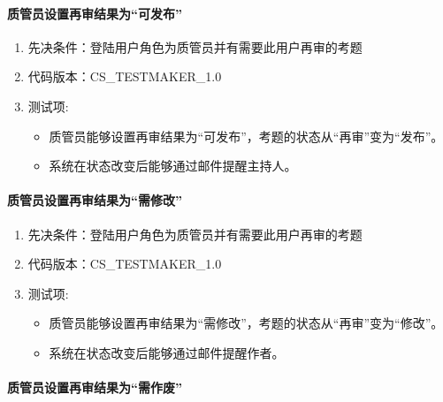 \documentclass[hyperref, a4paper]{ctexart}
\providecommand{\tightlist}{%
  \setlength{\itemsep}{0pt}\setlength{\parskip}{0pt}}
\let\oldparagraph\paragraph
\renewcommand{\paragraph}[1]{\oldparagraph{#1}\mbox{}}
\begin{document}
\hypertarget{ux8d28ux7ba1ux5458ux8bbeux7f6eux518dux5ba1ux7ed3ux679cux4e3aux53efux53d1ux5e03}{%
\paragraph{质管员设置再审结果为``可发布''}\label{ux8d28ux7ba1ux5458ux8bbeux7f6eux518dux5ba1ux7ed3ux679cux4e3aux53efux53d1ux5e03}}

\begin{enumerate}
\def\labelenumi{\arabic{enumi}.}
\tightlist
\item
  先决条件：登陆用户角色为质管员并有需要此用户再审的考题
\item
  代码版本：CS\_TESTMAKER\_1.0
\item
  测试项:

  \begin{itemize}
  \tightlist
  \item
    质管员能够设置再审结果为``可发布''，考题的状态从``再审''变为``发布''。
  \item
    系统在状态改变后能够通过邮件提醒主持人。
  \end{itemize}
\end{enumerate}

\hypertarget{ux8d28ux7ba1ux5458ux8bbeux7f6eux518dux5ba1ux7ed3ux679cux4e3aux9700ux4feeux6539}{%
\paragraph{质管员设置再审结果为``需修改''}\label{ux8d28ux7ba1ux5458ux8bbeux7f6eux518dux5ba1ux7ed3ux679cux4e3aux9700ux4feeux6539}}

\begin{enumerate}
\def\labelenumi{\arabic{enumi}.}
\tightlist
\item
  先决条件：登陆用户角色为质管员并有需要此用户再审的考题
\item
  代码版本：CS\_TESTMAKER\_1.0
\item
  测试项:

  \begin{itemize}
  \tightlist
  \item
    质管员能够设置再审结果为``需修改''，考题的状态从``再审''变为``修改''。
  \item
    系统在状态改变后能够通过邮件提醒作者。
  \end{itemize}
\end{enumerate}

\hypertarget{ux8d28ux7ba1ux5458ux8bbeux7f6eux518dux5ba1ux7ed3ux679cux4e3aux9700ux4f5cux5e9f}{%
\paragraph{质管员设置再审结果为``需作废''}\label{ux8d28ux7ba1ux5458ux8bbeux7f6eux518dux5ba1ux7ed3ux679cux4e3aux9700ux4f5cux5e9f}}
\end{document}
